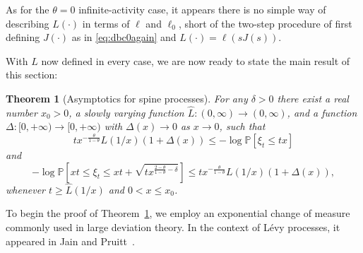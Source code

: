 \documentclass[a4,12pt]{amsart}
\numberwithin{equation}{section}
\newtheorem{thm}{Theorem}[section]
\begin{document}
As for the $\theta = 0$ infinite-activity case, it appears there is no simple way of describing $L(\cdot)$ in terms of $\ell$ and $\ell_0$, short of the two-step procedure of first defining $J(\cdot)$ as in \eqref{eq:dbc0again} and $L(\cdot) = \ell(sJ(s))$. 
 
With $L$ now defined in every case, we are now ready to state the main result of this section:

        
\begin{thm}[Asymptotics for spine processes] \label{thm:levybound}
 For any $\delta>0$ there exist a real number $x_0 > 0$, a slowly varying function $\hat{L}:(0,\infty) \to (0,\infty)$, and  a function $\Delta \colon [0,+\infty) \to [0,+\infty)$ with $\Delta(x) \to 0$ as $x \to 0$, such that 
\begin{equation*} 
	t x^{ - \frac{\theta}{1-\theta}} L(1/x) (1+\Delta(x))  \leq - \log\mathbb{P}[ \xi_t \leq t x] 
\end{equation*}
and
\begin{equation*}
	- \log\mathbb{P}\left[  xt  \leq \xi_t \leq xt + \sqrt{t x^{ \frac{2-\theta}{1-\theta} - \delta}}\right] 
	\leq t x^{ - \frac{\theta}{1-\theta}} L(1/x) (1 + \Delta(x)),
\end{equation*}
whenever $t \geq \hat{L}(1/x)$ and $0 < x \leq x_0$.
	\end{thm}


To begin the proof of Theorem~\ref{thm:levybound}, we employ an exponential change of measure commonly used in large deviation theory. In the context of L\'evy processes, it appeared in Jain and Pruitt~\cite[Lemma~5.2]{JP}.
\end{document}
